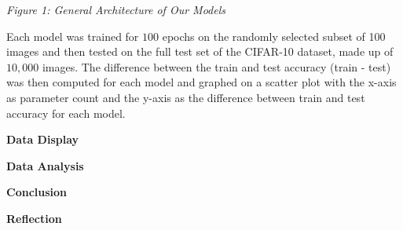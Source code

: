 \documentclass[12pt]{article}
\begin{document}
    \centerline{\textit{Figure 1: General Architecture of Our Models}}

    Each model was trained for $100$ epochs on the randomly selected subset of 100 images and then tested
    on the full test set of the CIFAR-10 dataset, made up of $10,000$ images. The difference between the train and test accuracy (train - test) was then
    computed for each model and graphed on a scatter plot with the x-axis
    as parameter count and the y-axis as the difference between train and test accuracy for each model.

    \noindent\textbf{Data Display}

    \noindent\textbf{Data Analysis}

    \noindent\textbf{Conclusion}

    \noindent\textbf{Reflection}
\end{document}
